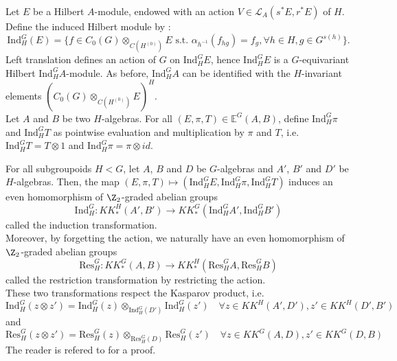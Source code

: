 
Let $E$ be a Hilbert $A$-module, endowed with an action $V\in\mathcal L_A(s^*E,r^*E)$ of $H$. Define the induced Hilbert module by :
\[\text{Ind}_H^G (E) = \{f \in C_0(G)\otimes_{C(H^{(0)})} E \text{ s.t. } \alpha_{h^{-1}}(f_{hg}) = f_g,\forall h\in H,g\in G^{s(h)}\}. \]
Left translation defines an action of $G$ on $\text{Ind}_H^G E$, hence $\text{Ind}_H^G E$ is a $G$-equivariant Hilbert $\text{Ind}_H^G A$-module. As before, $\text{Ind}_H^G A$ can be identified with the $H$-invariant elements $(C_0(G)\otimes_{C(H^{(0)})} E)^H$.\\

Let $A$ and $B$ be two $H$-algebras. For all $(E,\pi,T)\in \mathbb E^G(A,B)$, define $\text{Ind}_H^G \pi$ and $\text{Ind}_H^G T$ as pointwise evaluation and multiplication by $\pi$ and $T$, i.e. $\text{Ind}_H^G T = T\otimes 1$ and $\text{Ind}_H^G \pi  = \pi\otimes id$.

\begin{definition}
For all subgroupoids $H<G$, let $A$, $B$ and $D$ be $G$-algebras and $A'$, $B'$ and $D'$ be $H$-algebras. Then, the map $(E,\pi,T)\mapsto ( \text{Ind}_H^G E, \text{Ind}_H^G\pi ,\text{Ind}_H^G T )$ induces an even homomorphism of $\Z_2$-graded abelian groups
\[\text{Ind}_H^G : KK_*^H(A',B')\rightarrow KK_*^G( \text{Ind}_H^G A', \text{Ind}_H^G B') \] 
called the induction transformation.\\
Moreover, by forgetting the action, we naturally have an even homomorphism of $\Z_2$-graded abelian groups 
\[\text{Res}_H^G : KK_*^G(A,B)\rightarrow KK_*^H( \text{Res}_H^G A, \text{Res}_H^G B) \] 
called the restriction transformation by restricting the action.\\
These two transformations respect the Kasparov product, i.e. 
\[ \text{Ind}_H^G(z\otimes z') = \text{Ind}_H^G(z)\otimes_{\text{Ind}_H^G(D')}\text{Ind}_H^G(z')\quad \forall z\in KK^H(A',D'),z'\in KK^H(D',B') \]
and 
\[ \text{Res}_H^G(z\otimes z') = \text{Res}_H^G(z)\otimes_{\text{Res}_H^G(D)}\text{Res}_H^G(z')\quad \forall z\in KK^G(A,D),z'\in KK^G(D,B) \]
The reader is refered to \cite{LeGall} for a proof.
\end{definition}   

